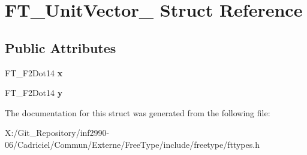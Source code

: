\hypertarget{struct_f_t___unit_vector__}{\section{F\-T\-\_\-\-Unit\-Vector\-\_\- Struct Reference}
\label{struct_f_t___unit_vector__}
}
\subsection*{Public Attributes}
\begin{DoxyCompactItemize}
\item 
\hypertarget{struct_f_t___unit_vector___a03c9f8ae35a5ad1bcac49995a9dac714}{F\-T\-\_\-\-F2\-Dot14 {\bfseries x}}\label{struct_f_t___unit_vector___a03c9f8ae35a5ad1bcac49995a9dac714}

\item 
\hypertarget{struct_f_t___unit_vector___a12eb9ad5c47614f5f2d3f9e401933d0e}{F\-T\-\_\-\-F2\-Dot14 {\bfseries y}}\label{struct_f_t___unit_vector___a12eb9ad5c47614f5f2d3f9e401933d0e}

\end{DoxyCompactItemize}


The documentation for this struct was generated from the following file\-:\begin{DoxyCompactItemize}
\item 
X\-:/\-Git\-\_\-\-Repository/inf2990-\/06/\-Cadriciel/\-Commun/\-Externe/\-Free\-Type/include/freetype/fttypes.\-h\end{DoxyCompactItemize}
